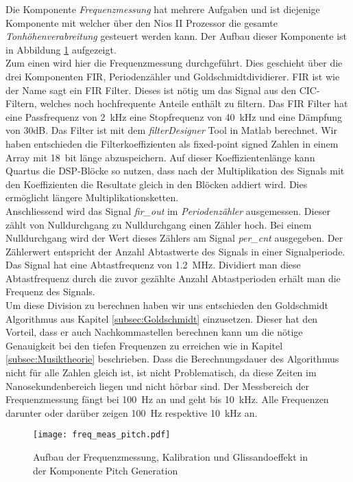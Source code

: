 Die Komponente \textit{Frequenzmessung} hat mehrere Aufgaben und ist diejenige Komponente mit welcher über den Nios II Prozessor die gesamte \textit{Tonhöhenverabreitung} gesteuert werden kann. Der Aufbau dieser Komponente ist in Abbildung \ref{img:freq_meas_pitch} aufgezeigt.\\
Zum einen wird hier die Frequenzmessung durchgeführt. Dies geschieht über die drei Komponenten FIR, Periodenzähler und Goldschmidtdividierer. FIR ist wie der Name sagt ein FIR Filter. Dieses ist nötig um das Signal aus den CIC-Filtern, welches noch hochfrequente Anteile enthält zu filtern. Das FIR Filter hat eine Passfrequenz von \SI{2}{kHz} eine Stopfrequenz von \SI{40}{kHz} und eine Dämpfung von 30dB. Das Filter ist mit dem \textit{filterDesigner} Tool in Matlab berechnet. Wir haben entschieden die Filterkoeffizienten als fixed-point signed Zahlen in einem Array mit \SI{18}{bit} länge abzuspeichern. Auf dieser Koeffizientenlänge kann Quartus die DSP-Blöcke so nutzen, dass nach der Multiplikation des Signals mit den Koeffizienten die Resultate gleich in den Blöcken addiert wird. Dies ermöglicht längere Multiplikationsketten. \cite{Cyclone_V}\\
Anschliessend wird das Signal \textit{fir\_out} im \textit{Periodenzähler} ausgemessen. Dieser zählt von Nulldurchgang zu Nulldurchgang einen Zähler hoch. Bei einem Nulldurchgang wird der Wert dieses Zählers am Signal \textit{per\_cnt} ausgegeben. Der Zählerwert entspricht der Anzahl Abtastwerte des Signals in einer Signalperiode. \\
Das Signal hat eine Abtastfrequenz von \SI{1.2}{MHz}. Dividiert man diese Abtastfrequenz durch die zuvor gezählte Anzahl Abtastperioden erhält man die Frequenz des Signals.\\ Um diese Division zu berechnen haben wir uns entschieden den Goldschmidt Algorithmus aus Kapitel \ref{subsec:Goldschmidt} einzusetzen. Dieser hat den Vorteil, dass er auch Nachkommastellen berechnen kann um die nötige Genauigkeit bei den tiefen Frequenzen zu erreichen wie in Kapitel \ref{subsec:Musiktheorie} beschrieben. Dass die Berechnungsdauer des Algorithmus nicht für alle Zahlen gleich ist, ist nicht Problematisch, da diese Zeiten im Nanosekundenbereich liegen und nicht hörbar sind. Der Messbereich der Frequenzmessung fängt bei \SI{100}{Hz} an und geht bis \SI{10}{kHz}. Alle Frequenzen darunter oder darüber zeigen \SI{100}{Hz} respektive \SI{10}{kHz} an.

\begin{figure}[h!]
	\centering
	\texttt{[image: freq\_meas\_pitch.pdf]}
	\caption{Aufbau der Frequenzmessung, Kalibration und Glissandoeffekt in der Komponente Pitch Generation} 
	\label{img:freq_meas_pitch}
\end{figure}  

